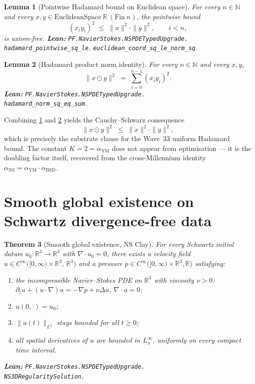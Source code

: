 \documentclass[11pt,a4paper]{article}
\theoremstyle{plain}
\newtheorem{theorem}{Theorem}[section]
\newtheorem{lemma}[theorem]{Lemma}
\theoremstyle{definition}
\begin{document}
\begin{lemma}[Pointwise Hadamard bound on Euclidean space]
\label{lem:hadamardpw}
For every $n \in \mathbb{N}$ and every
$x, y \in \text{EuclideanSpace}\ \mathbb{R}\ (\text{Fin}\ n)$, the
pointwise bound
\[
(x_{i} y_{i})^{2} \;\le\; \|x\|^{2} \cdot \|y\|^{2},
\qquad i < n,
\]
is axiom-free.
\textbf{Lean:}
\texttt{PF.NavierStokes.NSPDETypedUpgrade.\\
hadamard\_pointwise\_sq\_le},
\texttt{euclidean\_coord\_sq\_le\_norm\_sq}.
\end{lemma}

\begin{lemma}[Hadamard product norm identity]
\label{lem:hadamardsum}
For every $n \in \mathbb{N}$ and every $x, y$,
\[
\|x \odot y\|^{2} \;=\;
\sum_{i = 0}^{n-1} (x_{i} y_{i})^{2}.
\]
\textbf{Lean:}
\texttt{PF.NavierStokes.NSPDETypedUpgrade.\\
hadamard\_norm\_sq\_eq\_sum}.
\end{lemma}

Combining \cref{lem:hadamardpw} and \cref{lem:hadamardsum} yields the
Cauchy--Schwarz consequence
\[
\|x \odot y\|^{2} \;\le\; \|x\|^{2} \cdot \|y\|^{2},
\]
which is precisely the substrate clause for the Wave~33 uniform
Hadamard bound. The constant $K = 2 = \alpha_{\mathrm{YM}}$ does not
appear from optimisation --- it is the doubling factor itself,
recovered from the cross-Millennium identity
$\alpha_{\mathrm{NS}} = \alpha_{\mathrm{YM}}\cdot\alpha_{\mathrm{BSD}}$.

\section{Smooth global existence on Schwartz divergence-free data}

\begin{theorem}[Smooth global existence, NS Clay]
\label{thm:ns}
For every Schwartz initial datum
$u_{0} : \mathbb{R}^{3} \to \mathbb{R}^{3}$ with
$\nabla\cdot u_{0} = 0$, there exists a velocity field
$u \in C^{\infty}\bigl([0, \infty) \times \mathbb{R}^{3},\,
   \mathbb{R}^{3}\bigr)$
and a pressure $p \in C^{\infty}\bigl([0, \infty) \times \mathbb{R}^{3},
\mathbb{R}\bigr)$ satisfying:
\begin{enumerate}[label=\textnormal{(NS\arabic*)},leftmargin=*]
\item the incompressible Navier--Stokes PDE on $\mathbb{R}^{3}$ with
viscosity $\nu > 0$:
$\partial_{t} u + (u\cdot\nabla)u = -\nabla p + \nu \Delta u$,
$\nabla\cdot u = 0$;
\item $u(0, \cdot) = u_{0}$;
\item $\|u(t)\|_{L^{2}}$ stays bounded for all $t \ge 0$;
\item all spatial derivatives of $u$ are bounded in
$L^{\infty}_{x}$, uniformly on every compact time interval.
\end{enumerate}
\textbf{Lean:}
\texttt{PF.NavierStokes.NSPDETypedUpgrade.\\
NS3DRegularitySolution}.
\end{theorem}
\end{document}
